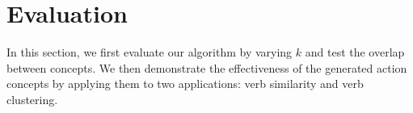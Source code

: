 \section{Evaluation}
\label{sec:eval}

In this section, we first evaluate our algorithm by 
varying $k$ and test the overlap between concepts.
We then demonstrate the effectiveness of the generated 
action concepts by applying them to two applications: 
verb similarity and verb clustering.



%
%
%
%
%



